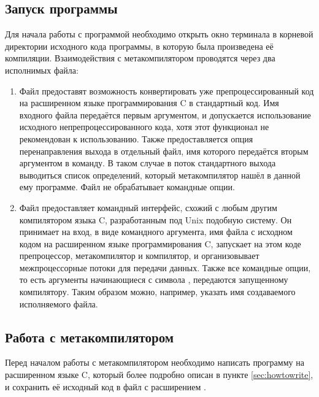 \subsection{Запуск программы}
Для начала работы с программой необходимо открыть окно терминала в корневой директории исходного кода программы, в которую была произведена её компиляции.
Взаимодействия с метакомпилятором проводятся через два исполнимых файла:
\begin{enumerate}
  \item Файл  предоставят возможность конвертировать уже препроцессированный код на расширенном языке программирования C в стандартный код.
  Имя входного файла передаётся первым аргументом, и допускается использование исходного непрепроцессированного кода, хотя этот функционал не рекомендован к использованию.
  Также предоставляется опция перенаправления выхода в отдельный файл, имя которого передаётся вторым аргументом в команду.
  В таком случае в поток стандартного выхода выводиться список определений, который метакомпилятор нашёл в данной ему программе. Файл  не обрабатывает командные опции.

  \item Файл  предоставляет командный интерфейс, схожий с любым другим компилятором языка C, разработанным под Unix подобную систему.
  Он принимает на вход, в виде командного аргумента, имя файла с исходном кодом на расширенном языке программирования C, запускает на этом коде препроцессор, метакомпилятор и компилятор, и организовывает межпроцессорные потоки для передачи данных.
  Также все командные опции, то есть аргументы начинающиеся с символа \cmd{-}, передаются запущенному компилятору.
  Таким образом можно, например, указать имя создаваемого исполняемого файла.
\end{enumerate}

\subsection{Работа с метакомпилятором}
Перед началом работы с метакомпилятором необходимо написать программу на расширенном языке C, который более подробно описан в пункте \ref{sec:howtowrite}, и сохранить её исходный код в файл с расширением .

